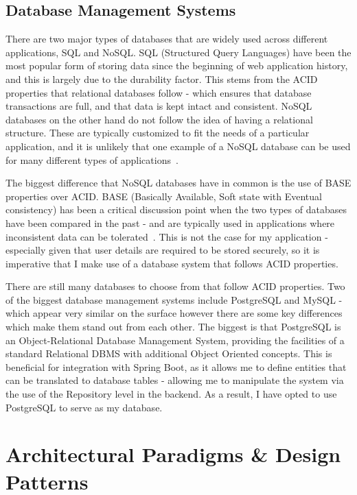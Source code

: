 \documentclass[]{final_report}
\begin{document}
\subsection {Database Management Systems}

There are two major types of databases that are widely used across different applications, SQL and NoSQL. SQL (Structured Query Languages) have been the most popular form of storing data since the beginning of web application history, and this is largely due to the durability factor. This stems from the ACID properties that relational databases follow - which ensures that database transactions are full, and that data is kept intact and consistent. NoSQL databases on the other hand do not follow the idea of having a relational structure. These are typically customized to fit the needs of a particular application, and it is unlikely that one example of a NoSQL database can be used for many different types of applications~\cite{SQL_COMPARE}.

The biggest difference that NoSQL databases have in common is the use of BASE properties over ACID. BASE (Basically Available, Soft state with Eventual consistency) has been a critical discussion point when the two types of databases have been compared in the past - and are typically used in applications where inconsistent data can be tolerated~\cite{SQL}. This is not the case for my application - especially given that user details are required to be stored securely, so it is imperative that I make use of a database system that follows ACID properties.

There are still many databases to choose from that follow ACID properties. Two of the biggest database management systems include PostgreSQL and MySQL - which appear very similar on the surface however there are some key differences which make them stand out from each other. The biggest is that PostgreSQL is an Object-Relational Database Management System, providing the facilities of a standard Relational DBMS with additional Object Oriented concepts. This is beneficial for integration with Spring Boot, as it allows me to define entities that can be translated to database tables - allowing me to manipulate the system via the use of the Repository level in the backend. As a result, I have opted to use PostgreSQL to serve as my database.

\newpage\section{Architectural Paradigms \& Design Patterns}
\end{document}

